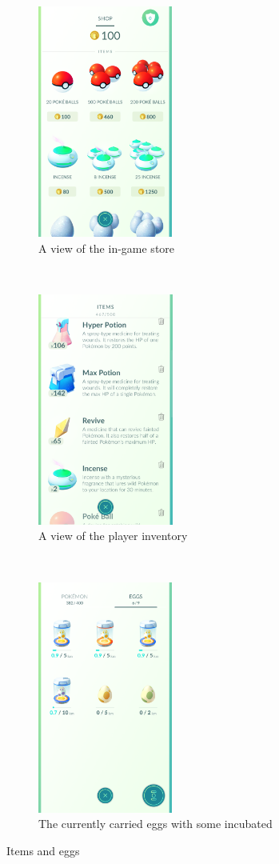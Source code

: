 \begin{figure}[h]
	\centering
	\begin{subfigure}[t]{0.3\textwidth}
		\centering
		\includegraphics[height=3in]{Figures/pogo-shop}
		\caption{A view of the in-game store}
	\end{subfigure}
	~
	\begin{subfigure}[t]{0.3\textwidth}
		\centering
		\includegraphics[height=3in]{Figures/pogo-inventory}
		\caption{A view of the player inventory}
	\end{subfigure}
	~
	\begin{subfigure}[t]{0.3\textwidth}
		\centering
		\includegraphics[height=3in]{Figures/pogo-incubated-eggs}
		\caption{The currently carried eggs with some incubated}
	\end{subfigure}
	\caption{Items and eggs}
\end{figure}

